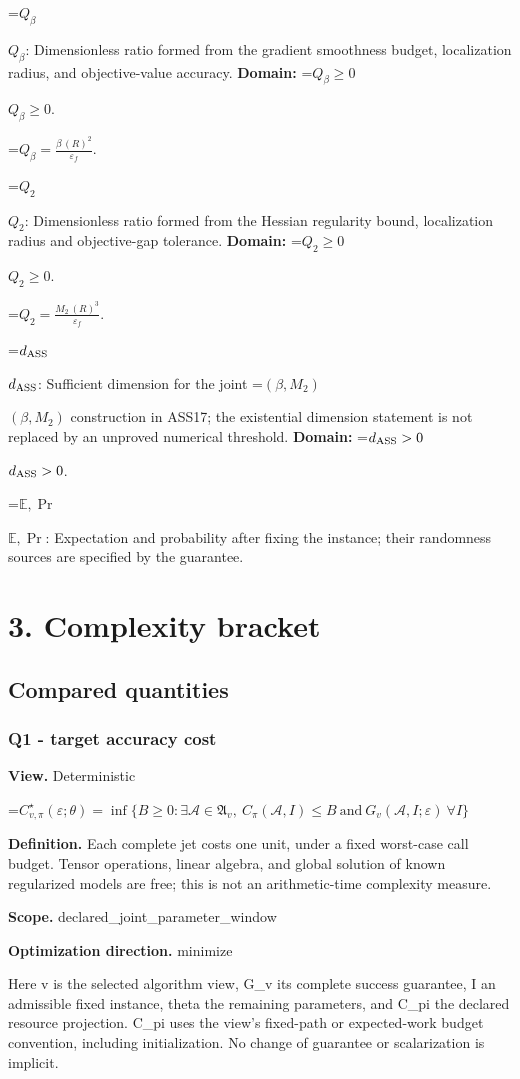 \documentclass[10pt,a4paper]{article}
\newcommand{\AtlasMath}[1]{\par\begingroup\centering\setbox0=\hbox{$\displaystyle #1$}\ifdim\wd0>1.4\linewidth\typeout{ATLAS WIDE FORMULA: \the\wd0}\fi\ifdim\wd0>\linewidth\resizebox{\linewidth}{!}{\box0}\else\box0\fi\par\endgroup}
\newcommand{\AtlasInlineMath}[1]{\begingroup\setbox0=\hbox{$#1$}\ifdim\wd0>.4\linewidth\endgroup\AtlasMath{#1}\else\endgroup$#1$\fi}
\begin{document}
\AtlasInlineMath{Q_\beta}: Dimensionless ratio formed from the gradient smoothness budget, localization radius, and objective-value accuracy. \textbf{Domain:} \AtlasInlineMath{Q_\beta\ge0}.


\AtlasMath{Q_\beta=\frac{\beta\,(R)^{2}}{\varepsilon_f}.}


\AtlasInlineMath{Q_2}: Dimensionless ratio formed from the Hessian regularity bound, localization radius and objective-gap tolerance. \textbf{Domain:} \AtlasInlineMath{Q_2\ge0}.


\AtlasMath{Q_2=\frac{M_2\,(R)^{3}}{\varepsilon_f}.}


\AtlasInlineMath{d_{\rm ASS}}: Sufficient dimension for the joint \AtlasInlineMath{(\beta,M_2)} construction in ASS17; the existential dimension statement is not replaced by an unproved numerical threshold. \textbf{Domain:} \AtlasInlineMath{d_{\rm ASS}>0}.

\AtlasInlineMath{\mathbb{E},\Pr}: Expectation and probability after fixing the instance; their randomness sources are specified by the guarantee.

\section{3. Complexity bracket}
\subsection{Compared quantities}
\subsubsection{Q1 - target accuracy cost}
\textbf{View.} Deterministic

\AtlasMath{C^\star_{v,\pi}(\varepsilon;\theta)=\inf\{B\ge0:\exists\mathcal A\in\mathfrak A_v,\ C_\pi(\mathcal A,I)\le B\ \text{and}\ G_v(\mathcal A,I;\varepsilon)\ \forall I\}}
\textbf{Definition.} Each complete jet costs one unit, under a fixed worst-case call budget. Tensor operations, linear algebra, and global solution of known regularized models are free; this is not an arithmetic-time complexity measure.

\textbf{Scope.} declared\_joint\_parameter\_window

\textbf{Optimization direction.} minimize

Here v is the selected algorithm view, G\_v its complete success guarantee, I an admissible fixed instance, theta the remaining parameters, and C\_pi the declared resource projection. C\_pi uses the view's fixed-path or expected-work budget convention, including initialization. No change of guarantee or scalarization is implicit.
\end{document}
